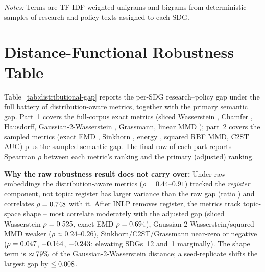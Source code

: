 \documentclass[12pt,a4paper]{article}
\let\OldSection\section
\renewcommand{\section}{\clearpage\FloatBarrier\OldSection}
\begin{document}
\begin{table}[ht]
\centering
\small
\caption{Distinctive TF-IDF terms for all 17 SDGs.}
\label{tab:semantic-gap-text-interpretability-full}
\resizebox{\textwidth}{!}{%

}
\par\smallskip\footnotesize\emph{Notes:} Terms are TF-IDF-weighted unigrams and bigrams from deterministic samples of research and policy texts assigned to each SDG.\par
\end{table}





\section{Distance-Functional Robustness Table}
\label{app:distributional-table}

Table~\ref{tab:distributional-gap} reports the per-SDG research--policy gap under the full battery of distribution-aware metrics, together with the primary semantic gap. Part~1 covers the full-corpus exact metrics (sliced Wasserstein \parencite{Bonneel2015}, Chamfer \parencite{Borgefors1988}, Hausdorff, Gaussian-2-Wasserstein \parencite{Villani2008}, Grassmann, linear MMD \parencite{Seijdinovic2013}); part~2 covers the sampled metrics (exact EMD \parencite{Rubner2000, Kusner2015}, Sinkhorn \parencite{Cuturi2013}, energy \parencite{Szekely2013}, squared RBF MMD, C2ST AUC) plus the sampled semantic gap. The final row of each part reports Spearman $\rho$ between each metric's ranking and the primary (adjusted) ranking.

  \textbf{Why the raw robustness result does not carry over:} Under raw embeddings the distribution-aware metrics ($\rho = 0.44$--$0.91$) tracked the \emph{register} component, not topic: register has larger variance than the raw gap (ratio \DistRawVarRatio{}) and correlates $\rho = 0.748$ with it. After INLP removes register, the metrics track topic-space shape -- most correlate moderately with the adjusted gap (sliced Wasserstein $\rho = 0.525$, exact EMD $\rho = 0.694$), Gaussian-2-Wasserstein/squared MMD weaker ($\rho \approx 0.24$--$0.26$), Sinkhorn/C2ST/Grassmann near-zero or negative ($\rho = 0.047{}$, $-0.164{}$, $-0.243{}$; elevating SDGs~12 and~1 marginally). The shape term is $\approx79\%$ of the Gaussian-2-Wasserstein distance; a seed-replicate shifts the largest gap by $\leq0.008{}$.
\end{document}
